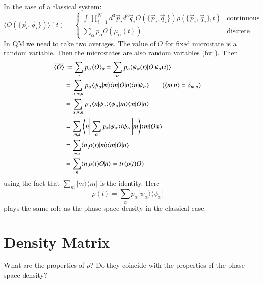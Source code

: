 \documentclass[12pt, a4paper, oneside, openright, titlepage]{book}
\begin{document}
In the case of a classical system: \begin{equation*}
    \langle O(\{\vec{p}_i,\vec{q}_i\})\rangle(t) = \left\{\begin{array}{cc} \int\prod_{i=1}^Nd^3\vec{p}_id^3\vec{q}_iO(\{\vec{p}_i,\vec{q}_i\})\rho(\{\vec{p}_i,\vec{q}_i\},t) & \text{continuous} \\ \sum_{\alpha}p_{\alpha}O(\mu_{\alpha}(t)) & \text{discrete} \end{array}\right.
\end{equation*}
In QM we need to take two averages. The value of $O$ for fixed microstate is a random variable. Then the microstates are also random variables (for ). Then \begin{align*}
    \overline{\langle O\rangle} &:= \sum_{\alpha}p_{\alpha}\langle O\rangle_{\alpha} = \sum_{\alpha}p_{\alpha}\langle \psi_{\alpha}(t)|O|\psi_{\alpha}(t)\rangle \\
    &= \sum_{\alpha,m,n}p_{\alpha}\langle \psi_{\alpha}|m\rangle\langle m|O|n\rangle\langle n|\psi_{\alpha}\rangle \tag{$\langle m|n\rangle=\delta_{m,n}$} \\
    &= \sum_{\alpha,m,n}p_{\alpha}\langle n|\psi_{\alpha}\rangle\langle \psi_{\alpha}|m\rangle\langle m|O|n\rangle \\
    &= \sum_{m,n}\Bigg\langle n \Bigg\vert\sum_{\alpha}p_{\alpha}|\psi_{\alpha}\rangle\langle \psi_{\alpha}|\Bigg\vert m \Bigg\rangle\langle m|O|n\rangle \\
    &= \sum_{m,n}\langle n|\rho(t)|m\rangle\langle m|O|n\rangle \\
    &= \sum_n\langle n|\rho(t)O|n\rangle = tr(\rho(t)O)
\end{align*}
using the fact that $\sum_m|m\rangle\langle m|$ is the identity. Here \begin{equation*}
    \rho(t) = \sum_{\alpha}p_{\alpha}|\psi_{\alpha}\rangle\langle \psi_{\alpha}|
\end{equation*}
plays the same role as the phase space density in the classical case.




\section{Density Matrix}

\begin{qst}
    What are the properties of $\rho$? Do they coincide with the properties of the phase space density?
\end{qst}
\end{document}
